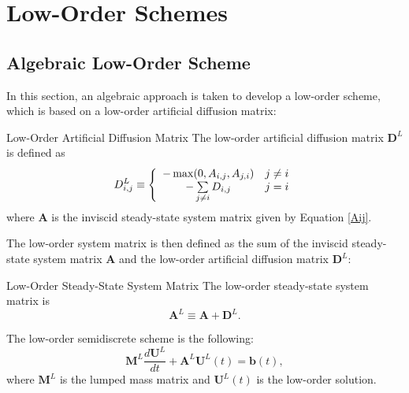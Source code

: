 \section{Low-Order Schemes}
\subsection{Algebraic Low-Order Scheme}\label{algebraicloworder}
In this section, an algebraic approach is taken to develop a low-order scheme,
which is based on a low-order artificial diffusion matrix:
\begin{definition}{Low-Order Artificial Diffusion Matrix}
   The low-order artificial diffusion matrix $\mathbf{D}^L$ is defined as
   \begin{equation}
      D_{i,j}^L \equiv \left\{\begin{array}{c c}
         -\max(0,A_{i,j},A_{j,i}) & j\ne i\\
         -\sum\limits_{j\ne i} D_{i,j} & j = i
      \end{array}\right.
   \end{equation}
   where $\mathbf{A}$ is the inviscid steady-state system matrix given by
   Equation \eqref{Aij}.
\end{definition}
The low-order system matrix is then defined as the sum of the inviscid
steady-state system matrix $\mathbf{A}$ and the low-order artificial diffusion
matrix $\mathbf{D}^L$:
\begin{definition}{Low-Order Steady-State System Matrix}
   The low-order steady-state system matrix is
   \begin{equation}\label{systemmatrixdef}
      \mathbf{A}^L \equiv \mathbf{A} + \mathbf{D}^L.
   \end{equation}
\end{definition}
The low-order semidiscrete scheme is the following:
\begin{equation}\label{semidiscretelow}
   \mathbf{M}^L\frac{d\mathbf{U}^L}{dt}+\mathbf{A}^L \mathbf{U}^L(t) = \mathbf{b}(t),
\end{equation}
where $\mathbf{M}^L$ is the lumped mass matrix and $\mathbf{U}^L(t)$ is the low-order
solution.
